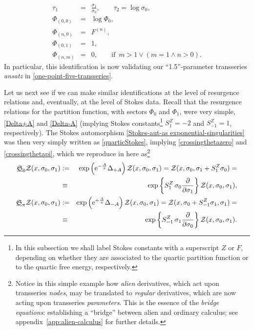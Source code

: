 \documentclass[11pt,a4paper]{article}
\newcommand{\CZ}{{\cal Z}}
\newcommand{\bea}{\begin{eqnarray}}
\newcommand{\eea}{\end{eqnarray}}
\newcommand{\rme}{{\mathrm{e}}}
\begin{document}
%
\bea
\label{transseries-sigma-vs-tau}
\tau_1 &=& \frac{\sigma_1}{\sigma_{0}}, \qquad \tau_2 = \log \sigma_0, \\
\label{transseries-Phi00-vs-logPhi0}
\Phi_{(0,0)} &=& \log \Phi_0, \\
\label{transseries-Phin0-vs-Fn}
\Phi_{(n,0)} &=& F^{(n)}, \\
\label{transseries-Phi01-vs-1}
\Phi_{(0,1)} &=& 1, \\
\Phi_{(n,m)} &=& 0, \qquad \text{if }\, m>1 \vee \left( m=1 \wedge n>0 \right).
\eea
%
\noindent
In particular, this identification is now validating our ``1.5''-parameter transseries \textit{ansatz} in \eqref{one-point-five-transseries}.

Let us next see if we can make similar identifications at the level of resurgence relations and, eventually, at the level of Stokes data. Recall that the resurgence relations for the partition function, with sectors $\Phi_{0}$ and $\Phi_{1}$, were very simple, \eqref{Delta+A} and \eqref{Delta-A} (implying Stokes constants\footnote{In this subsection we shall label Stokes constants with a superscript $Z$ or $F$, depending on whether they are associated to the quartic partition function or to the quartic free energy, respectively.} $S_{1}^{Z}=-2$ and $S_{-1}^{Z}=1$, respectively). The Stokes automorphism \eqref{Stokes-aut-as exponential-singularities} was then very simply written as \eqref{quarticStokes}, implying \eqref{crossingthetazero} and \eqref{crossingthetapi}, which we reproduce in here as\footnote{Notice in this simple example how \textit{alien} derivatives, which act upon transseries \textit{nodes}, may be translated to \textit{regular} derivatives, which are now acting upon transseries \textit{parameters}. This is the essence of the \textit{bridge equations}: establishing a ``bridge'' between alien and ordinary calculus; see appendix~\ref{app:alien-calculus} for further details.}
%
\begin{eqnarray}
\underline{\mathfrak{S}}_{0} \CZ (x, \sigma_{0}, \sigma_{1}) &:=& \exp \left( \rme^{-\frac{A}{x}} \Delta_{+A} \right) \CZ (x, \sigma_{0}, \sigma_{1}) = \CZ (x, \sigma_{0}, \sigma_{1} + S_{1}^{Z} \sigma_{0} ) = \nonumber \\
&\equiv& \exp \left\{ S_{1}^{Z}\, \sigma_{0} \frac{\partial}{\partial\sigma_{1}} \right\} \CZ (x, \sigma_{0}, \sigma_{1}), 
\label{stokes-zero-sigmas}\\
\underline{\mathfrak{S}}_{\pi} \CZ (x, \sigma_{0}, \sigma_{1}) &:=& \exp \left( \rme^{+\frac{A}{x}} \Delta_{-A} \right) \CZ (x, \sigma_{0}, \sigma_{1}) = \CZ (x, \sigma_{0} + S_{-1}^{Z} \sigma_{1}, \sigma_{1} ) = \nonumber \\
&\equiv& \exp \left\{ S_{-1}^{Z}\, \sigma_{1} \frac{\partial}{\partial\sigma_{0}} \right\} \CZ (x, \sigma_{0}, \sigma_{1}).
\label{stokes-pi-sigmas}
\end{eqnarray}
\end{document}
